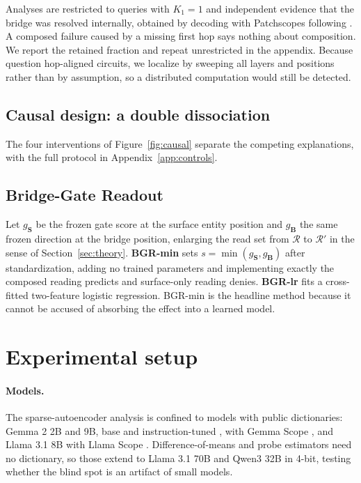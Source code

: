 \documentclass{article}
\newcommand{\gate}{\mathbf{S}}
\newcommand{\bridge}{\mathbf{B}}
\begin{document}
Analyses are restricted to queries with $K_1=1$ and independent evidence that the bridge was resolved
internally, obtained by decoding with Patchscopes \citep{ghandeharioun2024patchscopes} following
\citet{biran2024hopping}. A composed failure caused by a missing first hop says nothing about
composition. We report the retained fraction and repeat unrestricted in the appendix. Because
\citet{layerorder2026} question hop-aligned circuits, we localize by sweeping all layers and
positions rather than by assumption, so a distributed computation would still be detected.

\subsection{Causal design: a double dissociation}
\label{sec:causal-design}

The four interventions of Figure~\ref{fig:causal} separate the competing explanations, with the full
protocol in Appendix~\ref{app:controls}.

\subsection{Bridge-Gate Readout}
\label{sec:bgr}

Let $g_{\gate}$ be the frozen gate score at the surface entity position and $g_{\bridge}$ the same
frozen direction at the bridge position, enlarging the read set from $\mathcal{R}$ to $\mathcal{R}'$
in the sense of Section~\ref{sec:theory}. \textbf{BGR-min} sets
$s=\min(g_{\gate},g_{\bridge})$ after standardization, adding no trained parameters and implementing
exactly the composed reading predicts and surface-only reading denies. \textbf{BGR-lr} fits a cross-fitted
two-feature logistic regression. BGR-min is the headline method because it cannot be accused of
absorbing the effect into a learned model.

\section{Experimental setup}

\paragraph{Models.} The sparse-autoencoder analysis is confined to models with public dictionaries:
Gemma 2 2B and 9B, base and instruction-tuned \citep{gemma2024}, with Gemma Scope
\citep{lieberum2024gemmascope}, and Llama 3.1 8B \citep{dubey2024llama} with Llama Scope
\citep{he2024llamascope}. Difference-of-means and probe estimators need no dictionary, so those
extend to Llama 3.1 70B and Qwen3 32B \citep{qwen3} in 4-bit, testing whether the blind spot is an
artifact of small models.
\end{document}
